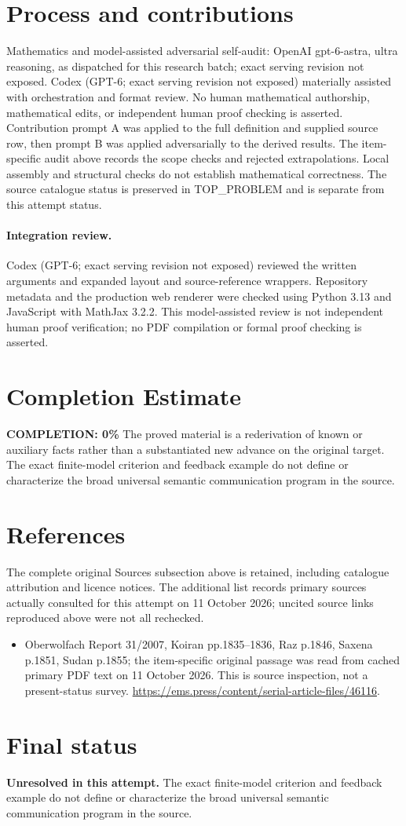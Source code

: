 \documentclass[11pt]{article}
\begin{document}
\section{Process and contributions}
Mathematics and model-assisted adversarial self-audit: OpenAI gpt-6-astra, ultra reasoning, as dispatched for this research batch; exact serving revision not exposed. Codex (GPT-6; exact serving revision not exposed) materially assisted with orchestration and format review. No human mathematical authorship, mathematical edits, or independent human proof checking is asserted.
Contribution prompt A was applied to the full definition and supplied source row, then prompt B was applied adversarially to the derived results. The item-specific audit above records the scope checks and rejected extrapolations. Local assembly and structural checks do not establish mathematical correctness. The source catalogue status is preserved in TOP\_PROBLEM and is separate from this attempt status.
\paragraph{Integration review.} Codex (GPT-6; exact serving revision not exposed) reviewed the written arguments and expanded layout and source-reference wrappers. Repository metadata and the production web renderer were checked using Python 3.13 and JavaScript with MathJax 3.2.2. This model-assisted review is not independent human proof verification; no PDF compilation or formal proof checking is asserted.

\section{Completion Estimate}
\noindent\textbf{COMPLETION: 0\%}
The proved material is a rederivation of known or auxiliary facts rather than a substantiated new advance on the original target. The exact finite-model criterion and feedback example do not define or characterize the broad universal semantic communication program in the source.
\section{References}
The complete original Sources subsection above is retained, including catalogue attribution and licence notices. The additional list records primary sources actually consulted for this attempt on 11 October 2026; uncited source links reproduced above were not all rechecked.
\begin{itemize}
\item Oberwolfach Report 31/2007, Koiran pp.1835--1836, Raz p.1846, Saxena p.1851, Sudan p.1855; the item-specific original passage was read from cached primary PDF text on 11 October 2026. This is source inspection, not a present-status survey. \url{https://ems.press/content/serial-article-files/46116}.
\end{itemize}
\section{Final status}
\textbf{Unresolved in this attempt.} The exact finite-model criterion and feedback example do not define or characterize the broad universal semantic communication program in the source.
\end{document}
